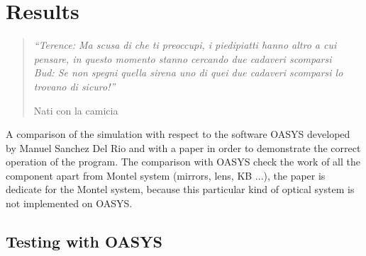 \chapter{Results}
\label{capitolo5}
\thispagestyle{empty}

\begin{quotation}
{\footnotesize
\noindent \emph{``Terence: Ma scusa di che ti preoccupi, i piedipiatti hanno altro a cui pensare, in questo momento stanno cercando due cadaveri scomparsi \\
Bud: Se non spegni quella sirena uno di quei due cadaveri scomparsi lo trovano di sicuro!''}
\begin{flushright}
Nati con la camicia
\end{flushright}
}
\end{quotation}
\vspace{0.5cm}

\noindent A comparison of the simulation with respect to the software OASYS developed by Manuel Sanchez Del Rio and with a paper in order to demonstrate the correct operation of the program. The comparison with OASYS check the work of all the component apart from Montel system (mirrors, lens, KB ...), the paper is dedicate for the Montel system, because this particular kind of optical system is not implemented on OASYS.

\section{Testing with OASYS}
